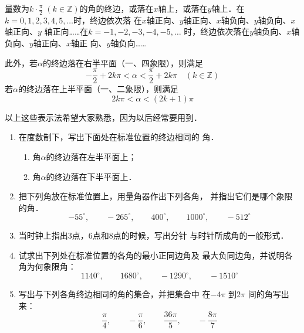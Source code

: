 量数为$k\cdot \frac{\pi}{2}\; (k\in\mathbb{Z})$的角的终边，或落在$x$轴上，或落在$y$轴上．在$k=0,1,2,3,4,5,\ldots$时，终边依次落
在$x$轴正向、$y$轴正向、$x$轴负向、$y$轴负向、$x$轴正向、$y$
轴正向……在$k=-1,-2,-3,-4,-5,\ldots$
时，终边依次落在$y$轴负向、$x$轴负向、$y$轴正向、$x$轴正
向、$y$轴负向……

此外，若$\alpha$的终边落在右半平面（一、四象限），则满足
\[-\frac{\pi}{2}+2k\pi<\alpha<\frac{\pi}{2}+2k\pi\quad (k\in\mathbb{Z})\]
若$\alpha$的终边落在上半平面（一、二象限），则满足
\[2k\pi <\alpha<(2k+1)\pi \]

以上这些表示法希望大家熟悉，因为以后经常要用到．

\begin{ex}
\begin{enumerate}
    \item 在度数制下，写出下面处在标准位置的终边相同的
    角．
        \begin{enumerate}    
    \item 角$\alpha$的终边落在左半平面上；
    \item 角$\alpha$的终边落在下半平面上．     
    \end{enumerate}

    
    \item 把下列角放在标准位置上，用量角器作出下列各角，
    并指出它们是哪个象限的角．
    \[-55^{\circ},\qquad -265^{\circ},\qquad 400^{\circ} ,\qquad 1000^{\circ},\qquad -512^{\circ} \]

    \item 当时钟上指出3点，6点和8点的时候，写出分针
    与时针所成角的一般形式．
    \item 试求出下列处在标准位置的各角的最小正同边角及
    最大负同边角，并说明各角为何象限角：
    \[1140^{\circ},\qquad 1680^{\circ},\qquad -1290^{\circ},\qquad -1510^{\circ}\]
\item 写出与下列各角终边相同的角的集合，并把集合中
在$-4\pi$ 到$2\pi$ 间的角写出来：
\[\frac{\pi}{4},\qquad -\frac{\pi}{6},\qquad \frac{36\pi}{5},\qquad -\frac{8\pi}{7}\]
\end{enumerate} 
\end{ex}

